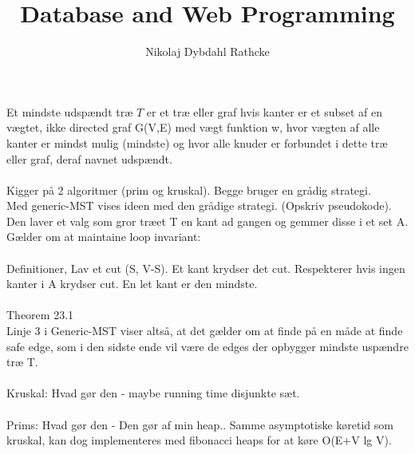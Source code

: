 \documentclass[12pt]{article}
\title{Database and Web Programming}
\author{Nikolaj Dybdahl Rathcke}
\begin{document}
Et mindste udspændt træ $T$ er et træ eller graf hvis kanter er et subset af en vægtet, ikke directed graf G(V,E) med vægt funktion w, hvor vægten af alle kanter er mindst mulig (mindste) og hvor alle knuder er forbundet i dette træ eller graf, deraf navnet udspændt.\\
\\
Kigger på 2 algoritmer (prim og kruskal). Begge bruger en grådig strategi.\\
Med generic-MST vises ideen med den grådige strategi. (Opskriv pseudokode). Den laver et valg som gror træet T en kant ad gangen og gemmer disse i et set A. Gælder om at maintaine loop invariant:\\
\\
Definitioner, Lav et cut (S, V-S). Et kant krydser det cut. Respekterer hvis ingen kanter i A krydser cut. En let kant er den mindste.\\
\\
Theorem 23.1
\\
Linje 3 i Generic-MST viser altså, at det gælder om at finde på en måde at finde safe edge, som i den sidste ende vil være de edges der opbygger mindste uspændre træ T.\\
\\
Kruskal: Hvad gør den - maybe running time disjunkte sæt.\\
\\
Prims: Hvad gør den -  Den gør af min heap.. Samme asymptotiske køretid som kruskal, kan dog implementeres med fibonacci heaps for at køre O(E+V lg V). 
 
\end{document}
